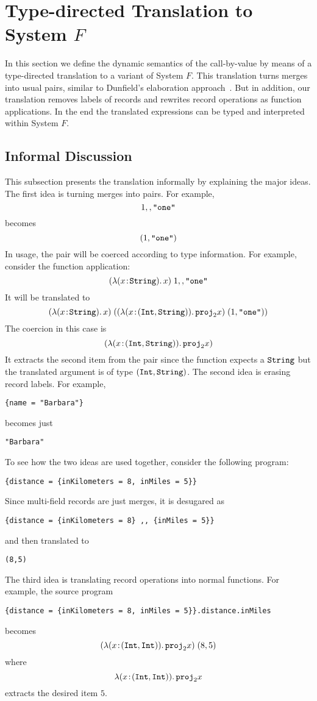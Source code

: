 \section{Type-directed Translation to System $ F $}

In this section we define the dynamic semantics of the call-by-value \name by
means of a type-directed translation to a variant of System $F$. This
translation turns merges into usual pairs, similar to Dunfield's elaboration
approach~\cite{dunfield2014elaborating,}. But in addition, our translation
removes labels of records and rewrites record operations as function
applications. In the end the translated expressions can be typed and interpreted
within System $F$.

\subsection{Informal Discussion}

This subsection presents the translation informally by explaining the major
ideas. The first idea is turning merges into pairs. For example,
\[
1 ,, \texttt{"one"}
\]
becomes
\[
(1, \texttt{"one"})
\]
In usage, the pair will be coerced according to type information. For example,
consider the function application:
\[
(\lambda (x \!:\! \texttt{String}).\, x) \; 1 ,, \texttt{"one"}
\]
It will be translated to
\[
(\lambda (x \!:\! \texttt{String}).\, x) \; ((\lambda (x \!:\! (\texttt{Int}, \texttt{String})).\, {\texttt{proj}}_{2} x) \; (1, \texttt{"one"}))
\]
The coercion in this case is
\[
(\lambda (x \!:\! (\texttt{Int}, \texttt{String})).\, {\texttt{proj}}_{2} x)
\]
It extracts the second item from the pair since the function expects a $\texttt{String}$
but the translated argument is of type $(\texttt{Int}, \texttt{String})$. The second idea is
erasing record labels. For example,
\begin{lstlisting}
{name = "Barbara"}
\end{lstlisting}
becomes just
\begin{lstlisting}
"Barbara"
\end{lstlisting}
To see how the two ideas are used together, consider the following program:
\begin{lstlisting}
{distance = {inKilometers = 8, inMiles = 5}}
\end{lstlisting}
Since multi-field records are just merges, it is desugared as
\begin{lstlisting}
{distance = {inKilometers = 8} ,, {inMiles = 5}}
\end{lstlisting}
and then translated to
\begin{lstlisting}
(8,5)
\end{lstlisting}
The third idea is translating record operations into normal functions. For
example, the source program
\begin{lstlisting}
{distance = {inKilometers = 8, inMiles = 5}}.distance.inMiles
\end{lstlisting}
becomes
\[
(\lambda (x \!:\! (\texttt{Int}, \texttt{Int})).\, {\texttt{proj}}_{2} x) \; (8, 5)
\]
where
\[
\lambda (x \!:\! (\texttt{Int}, \texttt{Int})).\, {\texttt{proj}}_{2} x 
\]
extracts the desired item $5$.

